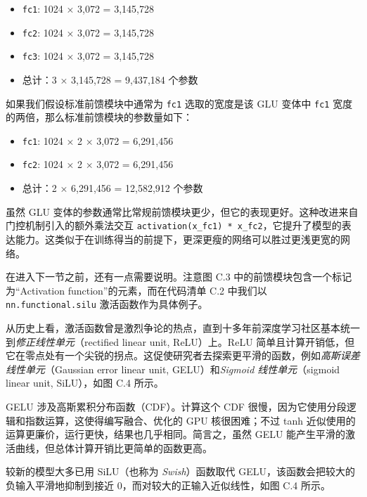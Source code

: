 \begin{itemize}
\item \texttt{fc1}: 1024 × 3,072 = 3,145,728
\item \texttt{fc2}: 1024 × 3,072 = 3,145,728
\item \texttt{fc3}: 1024 × 3,072 = 3,145,728
\item 总计：3 × 3,145,728 = 9,437,184 个参数
\end{itemize}

如果我们假设标准前馈模块中通常为 \texttt{fc1} 选取的宽度是该 GLU 变体中 \texttt{fc1} 宽度的两倍，那么标准前馈模块的参数量如下：

\begin{itemize}
\item \texttt{fc1}: 1024 × 2 × 3,072 = 6,291,456
\item \texttt{fc2}: 1024 × 2 × 3,072 = 6,291,456
\item 总计：2 × 6,291,456 = 12,582,912 个参数
\end{itemize}

虽然 GLU 变体的参数通常比常规前馈模块更少，但它的表现更好。这种改进来自门控机制引入的额外乘法交互 \texttt{activation(x\_fc1) * x\_fc2}，它提升了模型的表达能力。这类似于在训练得当的前提下，更深更瘦的网络可以胜过更浅更宽的网络。

在进入下一节之前，还有一点需要说明。注意图 C.3 中的前馈模块包含一个标记为“Activation function”的元素，而在代码清单 C.2 中我们以 \texttt{nn.functional.silu} 激活函数作为具体例子。

从历史上看，激活函数曾是激烈争论的热点，直到十多年前深度学习社区基本统一到\emph{修正线性单元}（rectified linear unit, ReLU）上。ReLU 简单且计算开销低，但它在零点处有一个尖锐的拐点。这促使研究者去探索更平滑的函数，例如\emph{高斯误差线性单元}（Gaussian error linear unit, GELU）和\emph{Sigmoid 线性单元}（sigmoid linear unit, SiLU），如图 C.4 所示。


GELU 涉及高斯累积分布函数（CDF）。计算这个 CDF 很慢，因为它使用分段逻辑和指数运算，这使得编写融合、优化的 GPU 核很困难；不过 tanh 近似使用的运算更廉价，运行更快，结果也几乎相同。简言之，虽然 GELU 能产生平滑的激活曲线，但总体计算开销比更简单的函数更高。

较新的模型大多已用 SiLU（也称为 \emph{Swish}）函数取代 GELU，该函数会把较大的负输入平滑地抑制到接近 0，而对较大的正输入近似线性，如图 C.4 所示。

